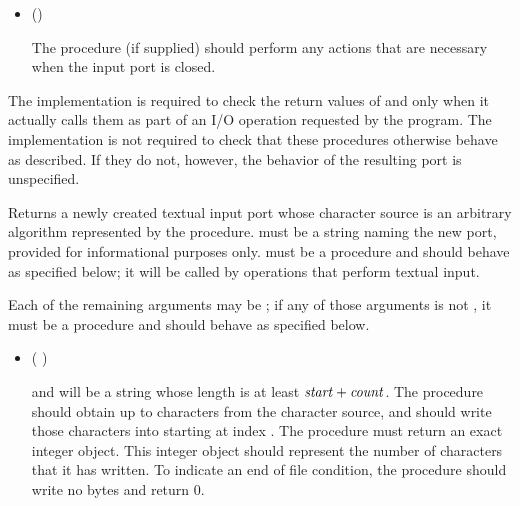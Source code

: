 \begin{entry}{%
}
\begin{itemize}
\item {\cf ()}
       
  The  procedure (if supplied) should perform any actions
  that are necessary when the input port is closed.
\end{itemize}

\implresp The implementation is required to check the return
values of  and  only when it actually calls
them as part of an I/O operation requested by the program.  The
implementation is not required to check that these procedures
otherwise behave as described.  If they do not, however, the behavior
of the resulting port is unspecified.
\end{entry}

\begin{entry}{%
}

Returns a newly created textual input port whose character source is
an arbitrary algorithm represented by the  procedure.
 must be a string naming the new port,
provided for informational purposes only.
 must be a procedure and should behave as specified
below; it will be called by operations that perform textual input.

Each of the remaining arguments may be \schfalse{}; if any of
those arguments is not \schfalse{}, it must be a procedure and
should behave as specified below.
   
\begin{itemize}
\item {\cf (   )}
       
  and  will be a string whose length is at least
  $\textnormal{\textit{start}} + \textnormal{\textit{count}}$.
  The  procedure should obtain up to  characters
  from the character source, and should write those characters
  into  starting at index .
  The  procedure must return an exact integer object.  This
  integer object should represent the number of characters that it has written.
  To indicate an end of file condition, the 
  procedure should write no bytes and return 0.


\end{itemize}
\end{entry}
